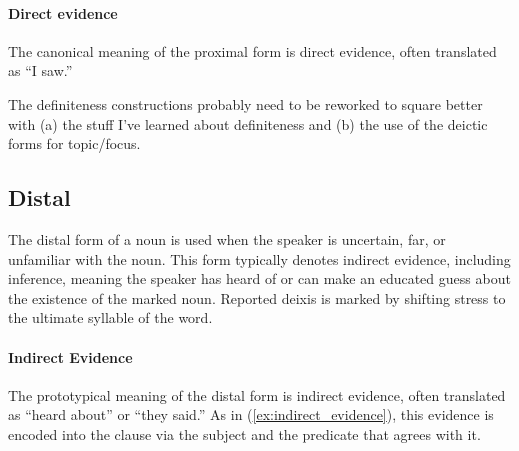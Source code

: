 \paragraph{Direct evidence}
The canonical meaning of the proximal form is direct evidence, often translated as “I saw.” 

\begin{kaobox}[frametitle=\sc todo:]
    The definiteness constructions probably need to be reworked to square better with (a) the stuff I've learned about definiteness and (b) the use of the deictic forms for topic/focus.
\end{kaobox}



\subsection{Distal}
The distal form of a noun is used when the speaker is uncertain, far, or unfamiliar with the noun. 
This form typically denotes indirect evidence, including inference, meaning the speaker has heard of or can make an educated guess about the existence of the marked noun. Reported deixis is marked by shifting stress to the ultimate syllable of the word.

\paragraph{Indirect Evidence}
The prototypical meaning of the distal form is indirect evidence, often translated as “heard about” or “they said.” As in (\ref{ex:indirect_evidence}), this evidence is encoded into the clause via the subject and the predicate that agrees with it.

